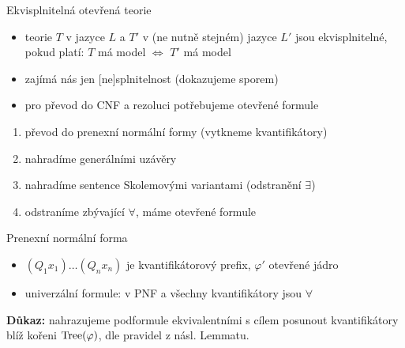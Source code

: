 \documentclass{beamer}
\begin{document}
\begin{frame}{Ekvisplnitelná otevřená teorie}

    \begin{itemize}
        \item teorie $T$ v jazyce $L$ a $T'$ v (ne nutně stejném) jazyce $L'$ jsou  \alert{ekvisplnitelné}, pokud platí: $T$ má model $\Leftrightarrow$ $T'$ má model \pause
        \item zajímá nás jen [ne]splnitelnost (dokazujeme sporem)\pause
        \item pro převod do CNF a rezoluci potřebujeme otevřené formule\pause 
    \end{itemize}


    \pause
    \begin{enumerate}
        \item převod do \alert{prenexní normální formy} (vytkneme kvantifikátory)\pause
        \item nahradíme generálními uzávěry \pause
        \item nahradíme sentence \alert{Skolemovými variantami} (odstranění $\exists$)\pause
        \item odstraníme zbývající $\forall$, máme otevřené formule
    \end{enumerate}

\end{frame}


\begin{frame}{Prenexní normální forma}

    \pause

    \pause
    \begin{itemize}
        \item $(Q_1x_1)\dots(Q_nx_n)$ je \alert{kvantifikátorový prefix}, $\varphi'$ \alert{otevřené jádro}\pause
        \item \alert{univerzální} formule: v PNF a všechny kvantifikátory jsou $\forall$
    \end{itemize}

    \pause
    
    \pause
    \textbf{Důkaz:} nahrazujeme podformule ekvivalentními s cílem posunout kvantifikátory blíž kořeni $\operatorname{Tree}(\varphi)$, dle pravidel z násl. Lemmatu.\hfill\qedsymbol

    \pause

\end{frame}
\end{document}
